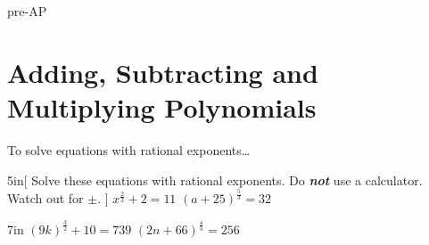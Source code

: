 \begin{taggedblock}{pre-AP}



\section{Adding, Subtracting and Multiplying Polynomials}

\begin{myConceptSteps}{To solve equations with rational exponents\dots}
\end{myConceptSteps}




\begin{my2Problems}[\large]{5in}[
        Solve these equations with rational exponents.
        Do {\bfseries\itshape not} use a calculator.
        Watch out for {\Large$\pm$}.
        ]
    {
        $ x^{\frac{2}{3}} + 2 = 11 $
    }
    {
        $ (a+25)^{\frac{5}{3}} = 32 $
    }
\end{my2Problems}
\begin{my2Problems}[\large]{7in}
    {
        $ (9k)^{\frac{3}{2}} + 10 = 739 $
    }
    {
        $ (2n + 66)^{\frac{4}{3}} = 256 $
    }
\end{my2Problems}


\end{taggedblock}
